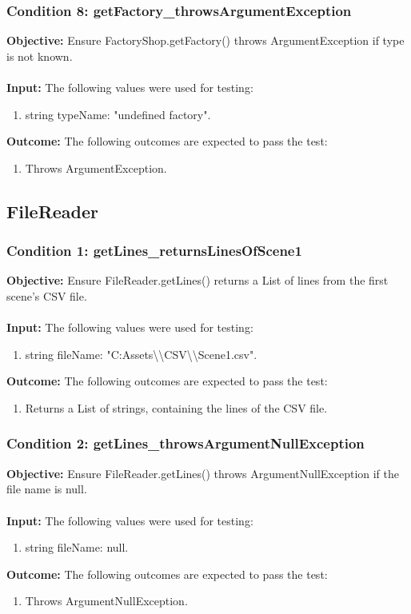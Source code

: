 \documentclass[a4paper,12pt]{article}
\begin{document}
		\subsubsection{Condition 8: getFactory\_throwsArgumentException}
			\textbf{Objective:} Ensure FactoryShop.getFactory() throws ArgumentException if type is not known.\\\\
			\textbf{Input:} The following values were used for testing:
				\begin{enumerate}
					\item string typeName: "undefined factory".
				\end{enumerate}
			\textbf{Outcome:} The following outcomes are expected to pass the test:
				\begin{enumerate}
					\item Throws ArgumentException.
				\end{enumerate}
	\subsection{FileReader}
		\subsubsection{Condition 1: getLines\_returnsLinesOfScene1}
			\textbf{Objective:} Ensure FileReader.getLines() returns a List of lines from the first scene's CSV file.\\\\
			\textbf{Input:} The following values were used for testing:
				\begin{enumerate}
					\item string fileName: "C:Assets\textbackslash \textbackslash CSV\textbackslash \textbackslash Scene1.csv".
				\end{enumerate}
			\textbf{Outcome:} The following outcomes are expected to pass the test:
				\begin{enumerate}
					\item Returns a List of strings, containing the lines of the CSV file.
				\end{enumerate}
		\subsubsection{Condition 2: getLines\_throwsArgumentNullException}
			\textbf{Objective:} Ensure FileReader.getLines() throws ArgumentNullException if the file name is null.\\\\
			\textbf{Input:} The following values were used for testing:
				\begin{enumerate}
					\item string fileName: null.
				\end{enumerate}
			\textbf{Outcome:} The following outcomes are expected to pass the test:
				\begin{enumerate}
					\item Throws ArgumentNullException.
				\end{enumerate}
\end{document}

